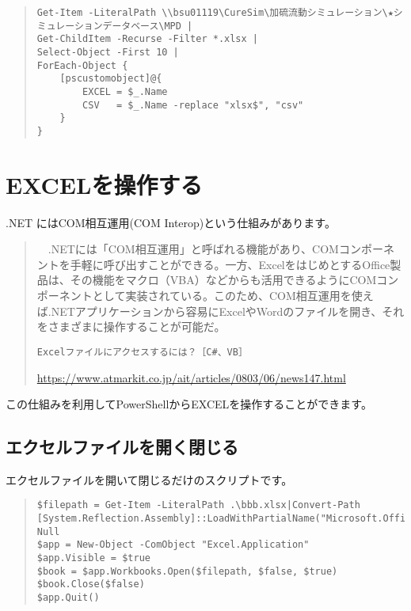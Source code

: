 \documentclass[dvipdfmx]{jsarticle}
\begin{document}
\begin{quote}
\begin{verbatim}
Get-Item -LiteralPath \\bsu01119\CureSim\加硫流動シミュレーション\★シミュレーションデータベース\MPD |
Get-ChildItem -Recurse -Filter *.xlsx |
Select-Object -First 10 |
ForEach-Object {
    [pscustomobject]@{
        EXCEL = $_.Name
        CSV   = $_.Name -replace "xlsx$", "csv"
    }
}
\end{verbatim}
\end{quote}


\section{EXCELを操作する}

.NET にはCOM相互運用(COM Interop)という仕組みがあります。

\begin{quote}
　.NETには「COM相互運用」と呼ばれる機能があり、COMコンポーネントを手軽に呼び出すことができる。一方、ExcelをはじめとするOffice製品は、その機能をマクロ（VBA）などからも活用できるようにCOMコンポーネントとして実装されている。このため、COM相互運用を使えば.NETアプリケーションから容易にExcelやWordのファイルを開き、それをさまざまに操作することが可能だ。
\vspace{\baselineskip}

\verb+Excelファイルにアクセスするには？［C#、VB］+

\href{https://www.atmarkit.co.jp/ait/articles/0803/06/news147.html}{https://www.atmarkit.co.jp/ait/articles/0803/06/news147.html}

\end{quote}

\vspace{\baselineskip}


この仕組みを利用してPowerShellからEXCELを操作することができます。

\subsection{エクセルファイルを開く閉じる}

エクセルファイルを開いて閉じるだけのスクリプトです。

\begin{quote}
\begin{verbatim}
$filepath = Get-Item -LiteralPath .\bbb.xlsx|Convert-Path
[System.Reflection.Assembly]::LoadWithPartialName("Microsoft.Office.Interop.Excel")|Out-Null
$app = New-Object -ComObject "Excel.Application"
$app.Visible = $true
$book = $app.Workbooks.Open($filepath, $false, $true)
$book.Close($false)
$app.Quit()
\end{verbatim}
\end{quote}
\end{document}
